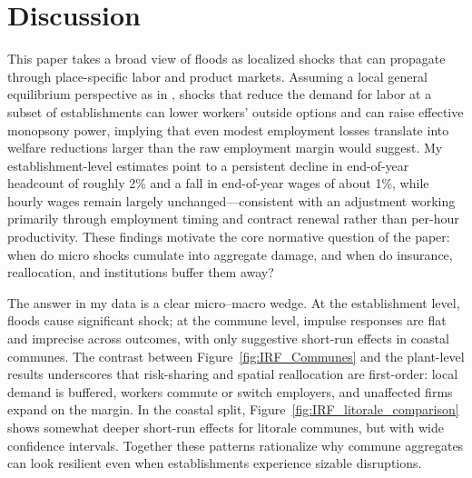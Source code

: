 \chapter{Discussion}
\label{ch: discussion}

This paper takes a broad view of floods as localized shocks that can propagate through place-specific labor and product markets. Assuming a local general equilibrium perspective as in \cite{kline2014people}, shocks that reduce the demand for labor at a subset of establishments can lower workers’ outside options and can raise effective monopsony power, implying that even modest employment losses translate into welfare reductions larger than the raw employment margin would suggest. My establishment-level estimates point to a persistent decline in end-of-year headcount of roughly 2\% and a fall in end-of-year wages of about 1\%, while hourly wages remain largely unchanged—consistent with an adjustment working primarily through employment timing and contract renewal rather than per-hour productivity. These findings motivate the core normative question of the paper: when do micro shocks cumulate into aggregate damage, and when do insurance, reallocation, and institutions buffer them away?

The answer in my data is a clear micro–macro wedge. At the establishment level, floods cause significant shock; at the commune level, impulse responses are flat and imprecise across outcomes, with only suggestive short-run effects in coastal communes. The contrast between Figure~\ref{fig:IRF_Communes} and the plant-level results underscores that risk-sharing and spatial reallocation are first-order: local demand is buffered, workers commute or switch employers, and unaffected firms expand on the margin. In the coastal split, Figure~\ref{fig:IRF_litorale_comparison} shows somewhat deeper short-run effects for litorale communes, but with wide confidence intervals. Together these patterns rationalize why commune aggregates can look resilient even when establishments experience sizable disruptions.


